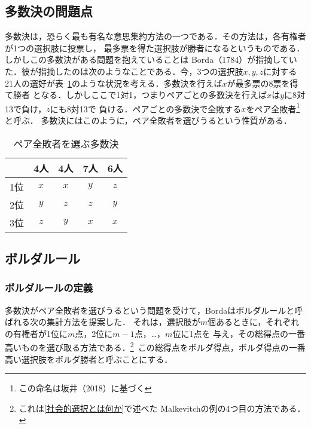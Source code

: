 \documentclass[dvipdfmx]{jsarticle}
\begin{document}
\subsection{多数決の問題点}\label{subsec:多数決の問題点}
多数決は，恐らく最も有名な意思集約方法の一つである．その方法は，各有権者が1つの選択肢に投票し，
最多票を得た選択肢が勝者になるというものである．しかしこの多数決がある問題を抱えていることは
Borda（1784）が指摘していた．彼が指摘したのは次のようなことである．今，3つの選択肢$x,y,z$に対する
21人の選好が表~\ref{ペア全敗者}のような状況を考える．多数決を行えば$x$が最多票の8票を得て勝者
となる．しかしここで1対1，つまりペアごとの多数決を行えば$x$は$y$に8対13で負け，$z$にも8対13で
負ける．ペアごとの多数決で全敗する$x$をペア全敗者\footnote{この命名は坂井（2018）に基づく}と呼ぶ．
多数決にはこのように，ペア全敗者を選びうるという性質がある．

\begin{table}[h]
  \caption{ペア全敗者を選ぶ多数決}\label{ペア全敗者}
  \begin{center}
    \begin{tabular}{c|c|c|c|c} \hline
      & 4人 & 4人 & 7人 & 6人 \\ \hline
      1位 & $x$ & $x$ & $y$ & $z$ \\
      2位 & $y$ & $z$ & $z$ & $y$ \\
      3位 & $z$ & $y$ & $x$ & $x$ \\ \hline 
    \end{tabular}
  \end{center}
\end{table}



\subsection{ボルダルール}\label{subsec:ボルダルール}
\subsubsection{ボルダルールの定義}\label{subsubsec:ボルダルールの定義}
多数決がペア全敗者を選びうるという問題を受けて，Bordaはボルダルールと呼ばれる次の集計方法を提案した．
それは，選択肢が$m$個あるときに，それぞれの有権者が1位に$m$点，2位に$m-1$点，\ldots，$m$位に1点を
与え，その総得点の一番高いものを選び取る方法である．\<\footnote{これは\ref{社会的選択とは何か}で述べた
Malkevitchの例の4つ目の方法である．}\ 
この総得点をボルダ得点，ボルダ得点の一番高い選択肢をボルダ勝者と呼ぶことにする．
\end{document}
